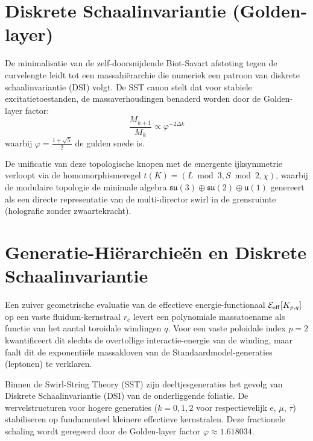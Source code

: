 \documentclass[12pt,a4paper]{article}
\begin{document}
            \section{Diskrete Schaalinvariantie (Golden-layer)}
                
                De minimalisatie van de zelf-doorsnijdende Biot-Savart afstoting tegen de curvelengte leidt tot een massahi\"erarchie die numeriek een patroon van diskrete schaalinvariantie (DSI) volgt. De SST canon stelt dat voor stabiele excitatietoestanden, de massaverhoudingen benaderd worden door de Golden-layer factor:
                \begin{equation}
                    \frac{M_{k+1}}{M_k} \propto \varphi^{-2\Delta k}
                \end{equation}
                waarbij $\varphi = \frac{1 + \sqrt{5}}{2}$ de gulden snede is.
                
                De unificatie van deze topologische knopen met de emergente ijksymmetrie verloopt via de homomorphismeregel $t(K) = (L \bmod 3, S \bmod 2, \chi)$, waarbij de modulaire topologie de minimale algebra $\mathfrak{su}(3)\oplus\mathfrak{su}(2)\oplus\mathfrak{u}(1)$ genereert als een directe representatie van de multi-director swirl in de grensruimte (holografie zonder zwaartekracht).
                
        
        
\section*{Generatie-Hi\"erarchie\"en en Diskrete Schaalinvariantie}

Een zuiver geometrische evaluatie van de effectieve energie-functionaal $\mathcal{E}_{\rm eff}[K_{p,q}]$ op een vaste fluidum-kernstraal $r_c$ levert een polynomiale massatoename als functie van het aantal toroidale windingen $q$. Voor een vaste poloidale index $p=2$ kwantificeert dit slechts de overtollige interactie-energie van de winding, maar faalt dit de exponenti\"ele massakloven van de Standaardmodel-generaties (leptonen) te verklaren.

Binnen de Swirl-String Theory (SST) zijn deeltjesgeneraties het gevolg van Diskrete Schaalinvariantie (DSI) van de onderliggende foliatie. De wervelstructuren voor hogere generaties ($k=0, 1, 2$ voor respectievelijk e, $\mu$, $\tau$) stabiliseren op fundamenteel kleinere effectieve kernstralen. Deze fractionele schaling wordt geregeerd door de Golden-layer factor $\varphi \approx 1.618034$.
\end{document}
